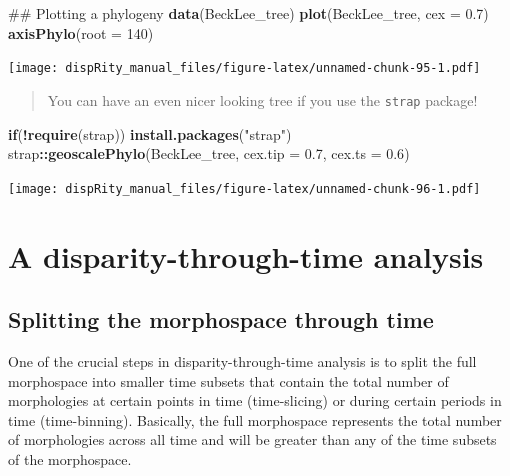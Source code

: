 \documentclass[]{book}
\newenvironment{Shaded}{\begin{snugshade}}{\end{snugshade}}
\newcommand{\KeywordTok}[1]{\textcolor[rgb]{0.13,0.29,0.53}{\textbf{#1}}}
\newcommand{\DataTypeTok}[1]{\textcolor[rgb]{0.13,0.29,0.53}{#1}}
\newcommand{\DecValTok}[1]{\textcolor[rgb]{0.00,0.00,0.81}{#1}}
\newcommand{\FloatTok}[1]{\textcolor[rgb]{0.00,0.00,0.81}{#1}}
\newcommand{\StringTok}[1]{\textcolor[rgb]{0.31,0.60,0.02}{#1}}
\newcommand{\ControlFlowTok}[1]{\textcolor[rgb]{0.13,0.29,0.53}{\textbf{#1}}}
\newcommand{\OperatorTok}[1]{\textcolor[rgb]{0.81,0.36,0.00}{\textbf{#1}}}
\newcommand{\NormalTok}[1]{#1}
\theoremstyle{definition}
\theoremstyle{definition}
\theoremstyle{remark}
\begin{document}
\begin{Shaded}
\begin{Highlighting}[]
\NormalTok{## Plotting a phylogeny}
\KeywordTok{data}\NormalTok{(BeckLee_tree)}
\KeywordTok{plot}\NormalTok{(BeckLee_tree, }\DataTypeTok{cex =} \FloatTok{0.7}\NormalTok{)}
\KeywordTok{axisPhylo}\NormalTok{(}\DataTypeTok{root =} \DecValTok{140}\NormalTok{)}
\end{Highlighting}
\end{Shaded}

\texttt{[image: dispRity\_manual\_files/figure-latex/unnamed-chunk-95-1.pdf]}

\begin{quote}
You can have an even nicer looking tree if you use the \texttt{strap}
package!
\end{quote}

\begin{Shaded}
\begin{Highlighting}[]
\ControlFlowTok{if}\NormalTok{(}\OperatorTok{!}\KeywordTok{require}\NormalTok{(strap)) }\KeywordTok{install.packages}\NormalTok{(}\StringTok{"strap"}\NormalTok{)}
\NormalTok{strap}\OperatorTok{::}\KeywordTok{geoscalePhylo}\NormalTok{(BeckLee_tree, }\DataTypeTok{cex.tip =} \FloatTok{0.7}\NormalTok{, }\DataTypeTok{cex.ts =} \FloatTok{0.6}\NormalTok{)}
\end{Highlighting}
\end{Shaded}

\texttt{[image: dispRity\_manual\_files/figure-latex/unnamed-chunk-96-1.pdf]}

\section{A disparity-through-time
analysis}\label{a-disparity-through-time-analysis}

\subsection{Splitting the morphospace through
time}\label{splitting-the-morphospace-through-time}

One of the crucial steps in disparity-through-time analysis is to split
the full morphospace into smaller time subsets that contain the total
number of morphologies at certain points in time (time-slicing) or
during certain periods in time (time-binning). Basically, the full
morphospace represents the total number of morphologies across all time
and will be greater than any of the time subsets of the morphospace.
\end{document}
